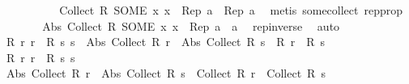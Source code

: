 \begin{isabellebody}
\ \ \ \ \isamarkupfalse%
\isanewline
\ \ \ \ \isamarkupfalse%
\ {\isachardoublequoteopen}Collect\ {\isacharparenleft}{\kern0pt}R\ {\isacharparenleft}{\kern0pt}SOME\ x{\isachardot}{\kern0pt}\ x\ {\isasymin}\ Rep\ a{\isacharparenright}{\kern0pt}{\isacharparenright}{\kern0pt}\ {\isacharequal}{\kern0pt}\ {\isacharparenleft}{\kern0pt}Rep\ a{\isacharparenright}{\kern0pt}{\isachardoublequoteclose}\ \isamarkupfalse%
\ {\isacharparenleft}{\kern0pt}metis\ some{\isacharunderscore}{\kern0pt}collect\ rep{\isacharunderscore}{\kern0pt}prop{\isacharparenright}{\kern0pt}\isanewline
\ \ \ \ \isamarkupfalse%
\ \isamarkupfalse%
\ {\isachardoublequoteopen}Abs\ {\isacharparenleft}{\kern0pt}Collect\ {\isacharparenleft}{\kern0pt}R\ {\isacharparenleft}{\kern0pt}SOME\ x{\isachardot}{\kern0pt}\ x\ {\isasymin}\ Rep\ a{\isacharparenright}{\kern0pt}{\isacharparenright}{\kern0pt}{\isacharparenright}{\kern0pt}\ {\isacharequal}{\kern0pt}\ a{\isachardoublequoteclose}\ \isamarkupfalse%
\ rep{\isacharunderscore}{\kern0pt}inverse\ \isamarkupfalse%
\ auto\isanewline
\ \ \ \ \isamarkupfalse%
\ {\isachardoublequoteopen}R\ r\ r\ {\isasymLongrightarrow}\ R\ s\ s\ {\isasymLongrightarrow}\ Abs\ {\isacharparenleft}{\kern0pt}Collect\ {\isacharparenleft}{\kern0pt}R\ r{\isacharparenright}{\kern0pt}{\isacharparenright}{\kern0pt}\ {\isacharequal}{\kern0pt}\ Abs\ {\isacharparenleft}{\kern0pt}Collect\ {\isacharparenleft}{\kern0pt}R\ s{\isacharparenright}{\kern0pt}{\isacharparenright}{\kern0pt}\ {\isasymlongleftrightarrow}\ R\ r\ {\isacharequal}{\kern0pt}\ R\ s{\isachardoublequoteclose}\isanewline
\ \ \ \ \isamarkupfalse%
\ {\isacharminus}{\kern0pt}\isanewline
\ \ \ \ \ \ \isamarkupfalse%
\ {\isachardoublequoteopen}R\ r\ r{\isachardoublequoteclose}\ \ {\isachardoublequoteopen}R\ s\ s{\isachardoublequoteclose}\isanewline
\ \ \ \ \ \ \isamarkupfalse%
\ \isamarkupfalse%
\ {\isachardoublequoteopen}Abs\ {\isacharparenleft}{\kern0pt}Collect\ {\isacharparenleft}{\kern0pt}R\ r{\isacharparenright}{\kern0pt}{\isacharparenright}{\kern0pt}\ {\isacharequal}{\kern0pt}\ Abs\ {\isacharparenleft}{\kern0pt}Collect\ {\isacharparenleft}{\kern0pt}R\ s{\isacharparenright}{\kern0pt}{\isacharparenright}{\kern0pt}\ {\isasymlongleftrightarrow}\ Collect\ {\isacharparenleft}{\kern0pt}R\ r{\isacharparenright}{\kern0pt}\ {\isacharequal}{\kern0pt}\ Collect\ {\isacharparenleft}{\kern0pt}R\ s{\isacharparenright}{\kern0pt}{\isachardoublequoteclose}\isanewline

\end{isabellebody}
